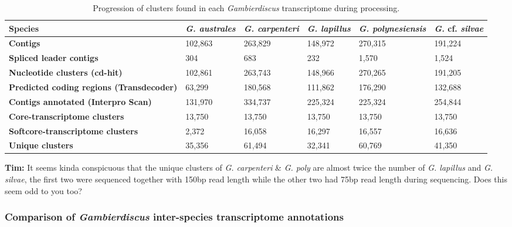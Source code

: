 \documentclass[12pt]{article}
\begin{document}
\begin{table}
\caption{Progression of clusters found in each \emph{Gambierdiscus} transcriptome during processing.}
\label{tbl:ClustTable}
\begin{tabular}{ | p{3cm} | p{2cm} | p{2.5cm} | p{2.5cm} | p{2cm} | p{2cm}|}
\hline
\textbf{Species}& \textit{G. australes}& \emph{G. carpenteri}&\emph{G. lapillus}&\emph{G. polynesiensis}&\emph{G.} cf. \emph{silvae}\\
\hline
\textbf{Contigs}&102,863&263,829&148,972&270,315&191,224\\
\hline
\textbf{Spliced leader contigs}&304&683&232&1,570&1,524\\
\hline
\textbf{Nucleotide clusters (cd-hit)}&102,861&263,743&148,966&270,265&191,205\\
\hline
\textbf{Predicted coding regions (Transdecoder)}&63,299&180,568&111,862&176,290&132,688\\
\hline
\textbf{Contigs annotated (Interpro Scan)}&131,970&334,737&225,324&225,324&254,844\\ 
\hline
\textbf{Core-transcriptome clusters}&13,750&13,750&13,750&13,750&13,750\\
\hline
\textbf{Softcore-transcriptome clusters}&2,372&16,058&16,297&16,557&16,636\\
\hline
\textbf{Unique clusters}&35,356&61,494&32,341&60,769&41,350\\
\hline
\end{tabular}
\end{table}
\FloatBarrier
\newpage
\textbf{Tim:} It seems kinda conspicuous that the unique clusters of \textit{G. carpenteri} \& \textit{G. poly} are almost twice the number of \textit{G. lapillus} and \textit{G. silvae}, the first two were sequenced together with 150bp read length while the other two had 75bp read length during sequencing. Does this seem odd to you too?

\subsubsection{Comparison of \emph{Gambierdiscus} inter-species transcriptome annotations}
\FloatBarrier
\end{document}
